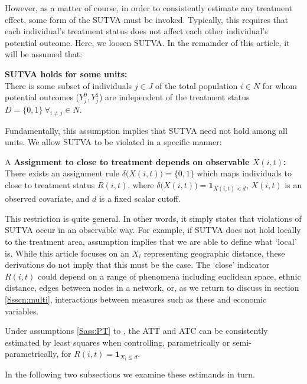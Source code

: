 However, as a matter of course, in order to consistently estimate any
treatment effect, some form of the SUTVA must be invoked.  Typically,
this requires that each individual's treatment status does not affect
each other individual's potential outcome.  Here, we loosen SUTVA. 
In the remainder of this article, it will be assumed that:
\begin{assumption}{3}{}
\label{Sass:SUTVAs}
\textbf{SUTVA holds for some units:} \\
There is some subset of individuals $j\in J$ of the total population $i\in N$ 
for whom potential outcomes ($Y_j^0, Y_j^1$) are independent of the treatment 
status $D=\{0,1\}\ \forall_{i\neq j} \in N$.
\end{assumption}
\noindent Fundamentally, this assumption implies that SUTVA need not hold among 
all units.  We allow SUTVA to be violated in a specific manner:
\begin{assumption}{4}{A}
\label{Sass:SUTVAl}
\textbf{Assignment to close to treatment depends on observable $X(i,t)$:} \\ 
There exists an assignment rule $\delta\Big(X(i,t)\Big)=\{0,1\}$ which maps 
individuals to close to treatment status $R(i,t)$, where $\delta\Big(X(i,t)\Big)=
\mathbf{1}_{X(i,t)<d}$, $X(i,t)$ is an observed covariate, and $d$ is a fixed
scalar cutoff. 
\end{assumption}
\vspace{-4mm}
\noindent This restriction is quite general.  In other words, it simply states 
that violations of SUTVA occur in an observable way.  For example, if SUTVA does
not hold locally to the treatment area, assumption  implies
that we are able to define what `local' is.  While this article focuses on
an $X_i$ representing geographic distance, these derivations do not imply that 
this must be the case.  The `close' indicator $R(i,t)$ could depend on a range 
of phenomena including euclidean space, ethnic distance, edges between
nodes in a network, or, as we return to discuss in section
\ref{Ssscn:multi}, interactions between measures such as  these and
economic variables. 
\begin{proposition}
\label{Pass:ATT}
Under assumptions \ref{Sass:PT} to , the ATT and ATC can be 
consistently estimated by least squares when controlling, parametrically or
semi-parametrically, for $R(i,t)=\mathbf{1}_{X_i\leq d}$.
\end{proposition}
\noindent In the following two subsections we examine these estimands in turn. 

